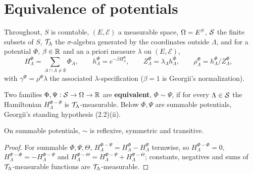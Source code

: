 \section{Equivalence of potentials}

Throughout, $S$ is countable, $(E,\mathcal{E})$ a measurable space, $\Omega = E^{S}$, $\mathcal{S}$ the
finite subsets of $S$, $\mathcal{T}_\Lambda$ the $\sigma$-algebra generated by the coordinates outside
$\Lambda$, and for a potential $\Phi$, $\beta \in \mathbb{R}$ and an a priori measure $\lambda$ on
$(E,\mathcal{E})$,
\[
  H_\Lambda^\Phi = \sum_{A \cap \Lambda \neq \emptyset} \Phi_A, \qquad
  h_\Lambda^\Phi = e^{-\beta H_\Lambda^\Phi}, \qquad
  Z_\Lambda^\Phi = \lambda_\Lambda h_\Lambda^\Phi, \qquad
  \rho_\Lambda^\Phi = h_\Lambda^\Phi / Z_\Lambda^\Phi ,
\]
with $\gamma^\Phi = \rho^\Phi \lambda$ the associated $\lambda$-specification ($\beta = 1$ is
Georgii's normalization).

\begin{definition}
    \label{def:equiv-potentials}
    \leanok

    Two families $\Phi, \Psi : \mathcal{S} \to \Omega \to \mathbb{R}$ are \textbf{equivalent}, $\Phi \sim \Psi$,
    if for every $\Lambda \in \mathcal{S}$ the Hamiltonian $H_\Lambda^{\Phi - \Psi}$ is
    $\mathcal{T}_\Lambda$-measurable. Below $\Phi, \Psi$ are summable potentials, Georgii's standing
    hypothesis (2.2)(ii).
\end{definition}

\begin{lemma}
    \label{lem:equiv-equivalence-relation}
    \leanok

    On summable potentials, $\sim$ is reflexive, symmetric and transitive.
\end{lemma}
\begin{proof}
    \leanok

    For summable $\Phi, \Psi, \Theta$, $H_\Lambda^{\Phi - \Psi} = H_\Lambda^{\Phi} -
    H_\Lambda^{\Psi}$ termwise, so $H_\Lambda^{\Phi-\Phi} = 0$, $H_\Lambda^{\Psi - \Phi} =
    -H_\Lambda^{\Phi - \Psi}$ and $H_\Lambda^{\Phi - \Theta} = H_\Lambda^{\Phi-\Psi} +
    H_\Lambda^{\Psi-\Theta}$; constants, negatives and sums of $\mathcal{T}_\Lambda$-measurable
    functions are $\mathcal{T}_\Lambda$-measurable.
\end{proof}


